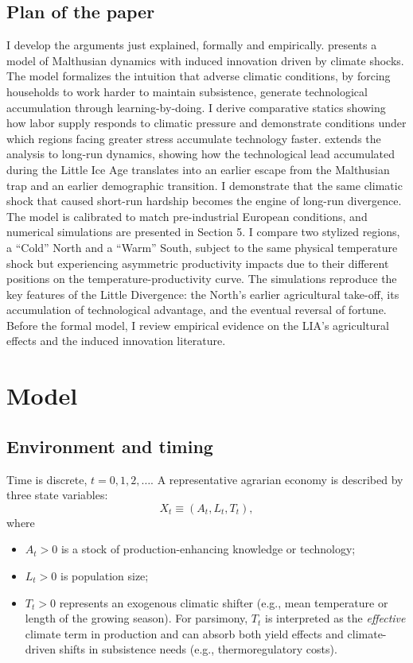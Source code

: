 \documentclass[11pt,a4paper]{article}
\begin{document}
\subsection*{Plan of the paper}
I develop the arguments just explained, formally and empirically.  presents a model of Malthusian dynamics with induced innovation driven by climate shocks. The model formalizes the intuition that adverse climatic conditions, by forcing households to work harder to maintain subsistence, generate technological accumulation through learning-by-doing. I derive comparative statics showing how labor supply responds to climatic pressure and demonstrate conditions under which regions facing greater stress accumulate technology faster.
 extends the analysis to long-run dynamics, showing how the technological lead accumulated during the Little Ice Age translates into an earlier escape from the Malthusian trap and an earlier demographic transition. I demonstrate that the same climatic shock that caused short-run hardship becomes the engine of long-run divergence.
The model is calibrated to match pre-industrial European conditions, and numerical simulations are presented in Section 5. I compare two stylized regions, a ``Cold'' North and a ``Warm'' South, subject to the same physical temperature shock but experiencing asymmetric productivity impacts due to their different positions on the temperature-productivity curve. The simulations reproduce the key features of the Little Divergence: the North's earlier agricultural take-off, its accumulation of technological advantage, and the eventual reversal of fortune.
Before the formal model, I review empirical evidence on the LIA's agricultural effects and the induced innovation literature.

\section{Model}

\subsection*{Environment and timing}

Time is discrete, \(t=0,1,2,\dots\). A representative agrarian economy is described by three state variables:
\[
  X_t \equiv (A_t, L_t, T_t),
\]
where
\begin{itemize}
  \item \(A_t>0\) is a stock of production-enhancing knowledge or technology;
  \item \(L_t>0\) is population size;
  \item \(T_t>0\) represents an exogenous climatic shifter (e.g., mean temperature or length of the growing season). For parsimony, \(T_t\) is interpreted as the \textit{effective} climate term in production and can absorb both yield effects and climate-driven shifts in subsistence needs (e.g., thermoregulatory costs).
\end{itemize}
\end{document}
